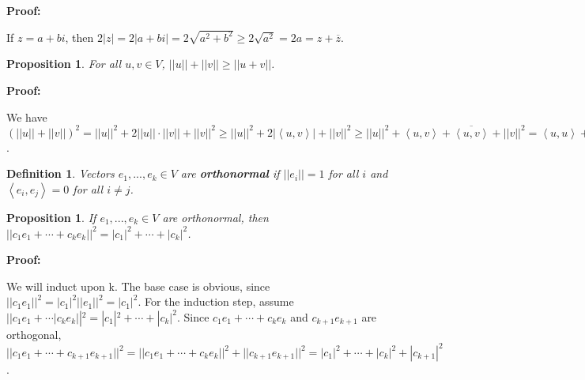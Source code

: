 \documentclass{article}
\theoremstyle{colontheorem}
\newtheorem{proposition}[theorem]{Proposition}
\newtheorem{definition}[theorem]{Definition}
\newenvironment{Proposition}
{
	\begin{mdframed}[backgroundcolor=TheoremOrange!10]
	\begin{proposition}
}
{
	\end{proposition}
	\end{mdframed}
	
	\vspace{.15in}
}
\newenvironment{Def}
{
	\begin{mdframed}[backgroundcolor=DefGreen!10]
	\begin{definition}
}
{
	\end{definition}
	\end{mdframed}
	
	\vspace{.15in}
}
\newenvironment{Proof}
{
	\vspace{-.3in}
	
	\begin{mdframed}[backgroundcolor=ProofPurple!10]
	\textbf{Proof:}%
}
{
	\end{mdframed}
	
	\vspace{.15in}
}
\begin{document}
\begin{Proof}
	If $z = a+bi$, then $2|z| = 2|a+bi| = 2\sqrt{a^2 + b^2} \geq 2\sqrt{a^2} = 2a = z + \overline{z}$.
	
\end{Proof}



\begin{Proposition}
	
	For all $u, v \in V$, $||u|| + ||v|| \geq ||u + v||$.

\end{Proposition}



\begin{Proof}
	We have $\left( ||u|| + ||v|| \right)^2 = ||u||^2 + 2||u|| \cdot ||v|| + ||v||^2 \geq ||u||^2 + 2 | \left< u, v \right> | + ||v||^2 \geq ||u||^2 + \left< u, v \right> + \overline{\left< u, v \right>} + ||v||^2 = \left< u, u \right> + \left< u, v \right> + \left< v, u \right> + \left< v, v \right> = \left< u + v, u + v \right> = ||u + v||^2$.
	
\end{Proof}



\begin{Def}
	
	Vectors $e_1, ..., e_k \in V$ are \textbf{orthonormal} if $||e_i|| = 1$ for all $i$ and $\left< e_i, e_j \right> = 0$ for all $i \neq j$.
	
\end{Def}



\begin{Proposition}
	
	If $e_1, ..., e_k \in V$ are orthonormal, then $||c_1 e_1 + \cdots + c_k e_k||^2 = |c_1|^2 + \cdots + |c_k|^2$.
	
\end{Proposition}



\begin{Proof}
	We will induct upon k. The base case is obvious, since $||c_1 e_1||^2 = |c_1|^2 ||e_1||^2 = |c_1|^2$. For the induction step, assume $||c_1 e_1 + \cdots | c_k e_k||^2 = |c_1|^2 + \cdots + |c_k|^2$. Since $c_1 e_1 + \cdots + c_k e_k$ and $c_{k+1} e_{k+1}$ are orthogonal, $||c_1 e_1 + \cdots + c_{k+1} e_{k+1}||^2 = ||c_1 e_1 + \cdots + c_k e_k||^2 + ||c_{k+1} e_{k+1}||^2 = |c_1|^2 + \cdots + |c_k|^2 + |c_{k+1}|^2$.
	
\end{Proof}
\end{document}
